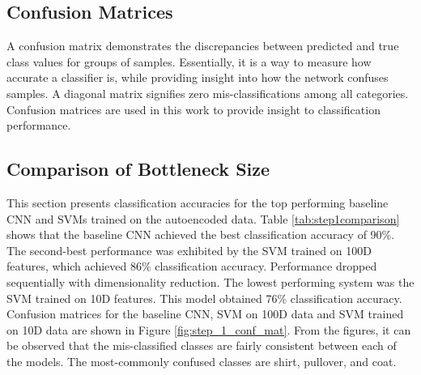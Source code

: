 \documentclass[conference]{IEEEtran}
\begin{document}
\subsection{Confusion Matrices}

A confusion matrix demonstrates the discrepancies between predicted and true class values for groups of samples.  Essentially, it is a way to measure how accurate a classifier is, while providing insight into how the network confuses samples.  A diagonal matrix signifies zero mis-classifications among all categories.  Confusion matrices are used in this work to provide insight to classification performance.

\subsection{Comparison of Bottleneck Size} \label{classification_accuracy}
This section presents classification accuracies for the top performing baseline CNN and SVMs trained on the autoencoded data.  Table \ref{tab:step1comparison} shows that the baseline CNN achieved the best classification accuracy of 90\%.  The second-best performance was exhibited by the SVM trained on 100D features, which achieved 86\% classification accuracy.  Performance dropped sequentially with dimensionality reduction.  The lowest performing system was the SVM trained on 10D features.  This model obtained 76\% classification accuracy.  Confusion matrices for the baseline CNN, SVM on 100D data and SVM trained on 10D data are shown in Figure \ref{fig:step_1_conf_mat}.
From the figures, it can be observed that the mis-classified classes are fairly consistent between each of the models.  The most-commonly confused classes are shirt, pullover, and coat.

\begin{figure*}[h!]%
	\centering
	\caption{Confusion matrix for the (a) baseline CNN, (b) SVM trained on data passed through an encoder network with bottleneck dimensionality 100 and (c) SVM trained on data passed through an encoder network with bottleneck dimensionality 10.  The CNN model classified 90\% of the test data correctly while the SVM 100D model classified 86\% correctly and the  SVM 10D classified 76\% correctly.}%
	\label{fig:step_1_conf_mat}%
\end{figure*}
\end{document}

